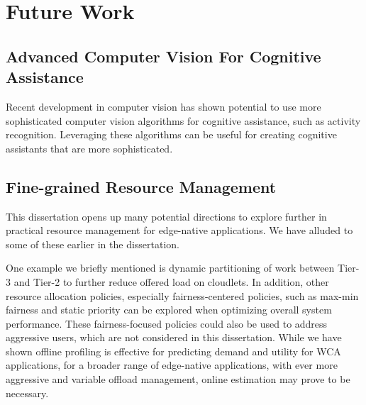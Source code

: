 


\section{Future Work}

\subsection{Advanced Computer Vision For Cognitive Assistance}

Recent development in computer vision has shown potential to use more
sophisticated computer vision algorithms for cognitive assistance, such as
activity recognition. Leveraging these algorithms can be useful for creating
cognitive assistants that are more sophisticated.

\subsection{Fine-grained Resource Management}

This dissertation opens up many potential directions to explore further in
practical resource management for edge-native applications. We have alluded to
some of these earlier in the dissertation. 

One example we briefly mentioned is dynamic partitioning of work between Tier-3
and Tier-2 to further reduce offered load on cloudlets.  In addition, other
resource allocation policies, especially fairness-centered policies, such as
max-min fairness and static priority can be explored when optimizing overall
system performance. These fairness-focused policies could also be used to
address aggressive users, which are not considered in this dissertation.  While
we have shown offline profiling is effective for predicting demand and utility
for WCA applications, for a broader range of edge-native applications, with ever
more aggressive and variable offload management, online estimation may prove to
be necessary. 

